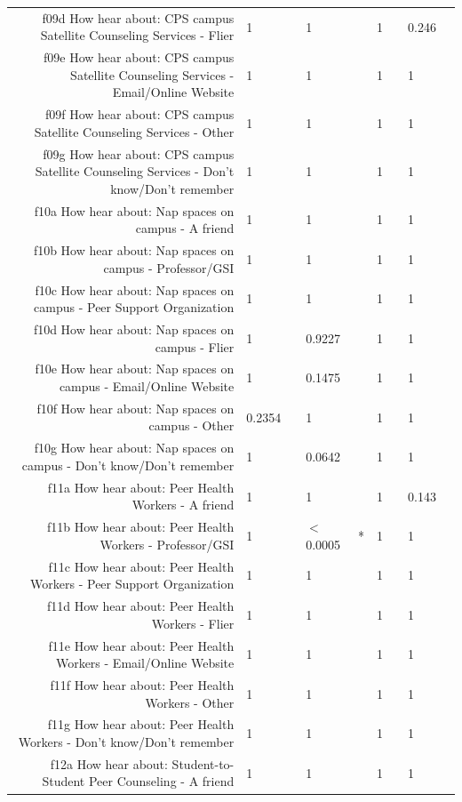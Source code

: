 \documentclass{article}\usepackage[]{graphicx}\usepackage[]{color}
\begin{document}
\begin{table}[ht]
{\begin{tabular}{rllllllll}
  f09d How hear about: CPS campus Satellite Counseling Services - Flier & 1 &   & 1 &   & 1 &   & 0.246 &   \\ 
  f09e How hear about: CPS campus Satellite Counseling Services - Email/Online Website & 1 &   & 1 &   & 1 &   & 1 &   \\ 
  f09f How hear about: CPS campus Satellite Counseling Services - Other & 1 &   & 1 &   & 1 &   & 1 &   \\ 
  f09g How hear about: CPS campus Satellite Counseling Services - Don't know/Don't remember & 1 &   & 1 &   & 1 &   & 1 &   \\ 
  f10a How hear about: Nap spaces on campus - A friend & 1 &   & 1 &   & 1 &   & 1 &   \\ 
  f10b How hear about: Nap spaces on campus - Professor/GSI & 1 &   & 1 &   & 1 &   & 1 &   \\ 
  f10c How hear about: Nap spaces on campus - Peer Support Organization & 1 &   & 1 &   & 1 &   & 1 &   \\ 
  f10d How hear about: Nap spaces on campus - Flier & 1 &   & 0.9227 &   & 1 &   & 1 &   \\ 
  f10e How hear about: Nap spaces on campus - Email/Online Website & 1 &   & 0.1475 &   & 1 &   & 1 &   \\ 
  f10f How hear about: Nap spaces on campus - Other & 0.2354 &   & 1 &   & 1 &   & 1 &   \\ 
  f10g How hear about: Nap spaces on campus - Don't know/Don't remember & 1 &   & 0.0642 &   & 1 &   & 1 &   \\ 
  f11a How hear about: Peer Health Workers - A friend & 1 &   & 1 &   & 1 &   & 0.143 &   \\ 
  f11b How hear about: Peer Health Workers - Professor/GSI & 1 &   & $<$0.0005 & * & 1 &   & 1 &   \\ 
  f11c How hear about: Peer Health Workers - Peer Support Organization & 1 &   & 1 &   & 1 &   & 1 &   \\ 
  f11d How hear about: Peer Health Workers - Flier & 1 &   & 1 &   & 1 &   & 1 &   \\ 
  f11e How hear about: Peer Health Workers - Email/Online Website & 1 &   & 1 &   & 1 &   & 1 &   \\ 
  f11f How hear about: Peer Health Workers - Other & 1 &   & 1 &   & 1 &   & 1 &   \\ 
  f11g How hear about: Peer Health Workers - Don't know/Don't remember & 1 &   & 1 &   & 1 &   & 1 &   \\ 
  f12a How hear about: Student-to-Student Peer Counseling - A friend & 1 &   & 1 &   & 1 &   & 1 &   \\ 

\end{tabular}}
\end{table}
\end{document}
